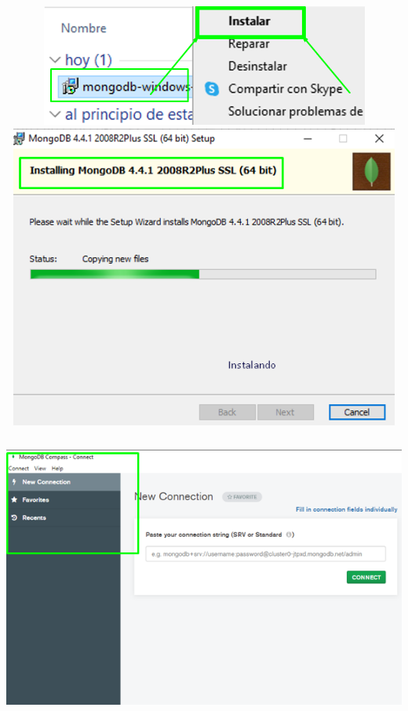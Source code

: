 \documentclass[12pt,a4paper,oneside]{book}
\begin{document}
\begin{itemize}
	\includegraphics[width=16cm, height=4cm]{img/2.png}\\
	\includegraphics[width=16cm, height=10cm]{img/3.png}\\
	\includegraphics[width=16cm, height=10cm]{img/4.png}\\
	

\end{itemize}
\end{document}
